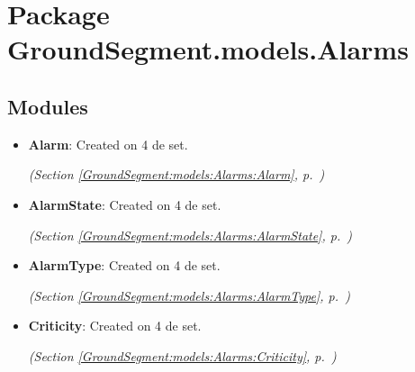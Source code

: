 %
%
%


\section{Package GroundSegment.models.Alarms}

    \label{GroundSegment:models:Alarms}


\subsection{Modules}

\begin{itemize}
\setlength{\parskip}{0ex}
\item \textbf{Alarm}: Created on 4 de set.



  \textit{(Section \ref{GroundSegment:models:Alarms:Alarm}, p.~\pageref{GroundSegment:models:Alarms:Alarm})}

\item \textbf{AlarmState}: Created on 4 de set.



  \textit{(Section \ref{GroundSegment:models:Alarms:AlarmState}, p.~\pageref{GroundSegment:models:Alarms:AlarmState})}

\item \textbf{AlarmType}: Created on 4 de set.



  \textit{(Section \ref{GroundSegment:models:Alarms:AlarmType}, p.~\pageref{GroundSegment:models:Alarms:AlarmType})}

\item \textbf{Criticity}: Created on 4 de set.



  \textit{(Section \ref{GroundSegment:models:Alarms:Criticity}, p.~\pageref{GroundSegment:models:Alarms:Criticity})}

\end{itemize}

